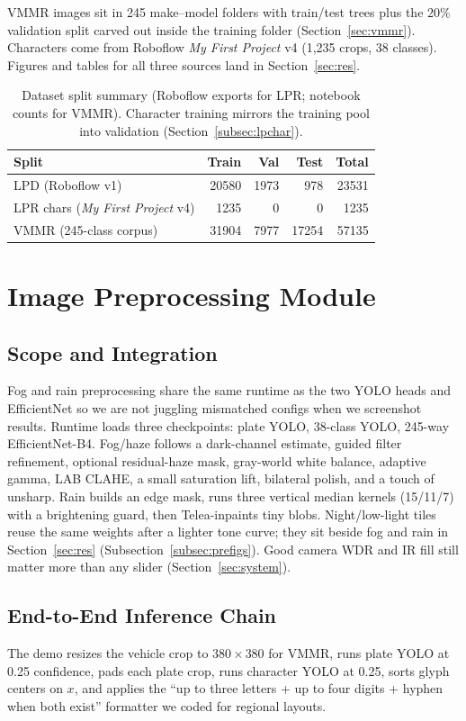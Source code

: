 \documentclass[10pt, conference]{IEEEtran}
\begin{document}
VMMR images sit in 245 make--model folders with train/test trees plus the 20\% validation split carved out inside the training folder (Section~\ref{sec:vmmr}). Characters come from Roboflow \emph{My First Project} v4 (1{,}235 crops, 38 classes). Figures and tables for all three sources land in Section~\ref{sec:res}.

\begin{table}[!htbp]
\centering
\caption{Dataset split summary (Roboflow exports for LPR; notebook counts for VMMR). Character training mirrors the training pool into validation (Section~\ref{subsec:lpchar}).}
\label{tab:splits}
\footnotesize
\begin{tabular}{@{}lrrrr@{}}
\toprule
Split & Train & Val & Test & Total \\
\midrule
LPD (Roboflow v1) & 20580 & 1973 & 978 & 23531 \\
LPR chars (\emph{My First Project} v4) & 1235 & 0 & 0 & 1235 \\
VMMR (245-class corpus) & 31904 & 7977 & 17254 & 57135 \\
\bottomrule
\end{tabular}
\end{table}

\section{Image Preprocessing Module}
\label{sec:pre}
\subsection{Scope and Integration}
Fog and rain preprocessing share the same runtime as the two YOLO heads and EfficientNet so we are not juggling mismatched configs when we screenshot results. Runtime loads three checkpoints: plate YOLO, 38-class YOLO, 245-way EfficientNet-B4. Fog/haze follows a dark-channel estimate, guided filter refinement, optional residual-haze mask, gray-world white balance, adaptive gamma, LAB CLAHE, a small saturation lift, bilateral polish, and a touch of unsharp. Rain builds an edge mask, runs three vertical median kernels (15/11/7) with a brightening guard, then Telea-inpaints tiny blobs. Night/low-light tiles reuse the same weights after a lighter tone curve; they sit beside fog and rain in Section~\ref{sec:res} (Subsection~\ref{subsec:prefigs}). Good camera WDR and IR fill still matter more than any slider (Section~\ref{sec:system}).

\subsection{End-to-End Inference Chain}
The demo resizes the vehicle crop to $380\times380$ for VMMR, runs plate YOLO at 0.25 confidence, pads each plate crop, runs character YOLO at 0.25, sorts glyph centers on $x$, and applies the ``up to three letters + up to four digits + hyphen when both exist'' formatter we coded for regional layouts.
\end{document}
